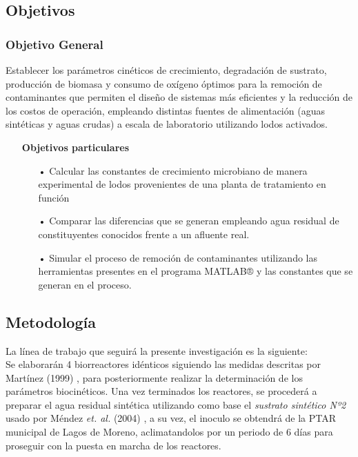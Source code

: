 \subsection*{Objetivos}
\subsubsection*{Objetivo General}
Establecer los parámetros cinéticos de crecimiento, degradación de sustrato, producción de biomasa y consumo de oxígeno óptimos para la remoción de contaminantes que permiten el diseño de sistemas más eficientes y la reducción de los costos de operación, empleando distintas fuentes de alimentación (aguas sintéticas y aguas crudas) a escala de laboratorio utilizando lodos activados.
	\begin{itemize}
		\item[] \textbf{Objetivos particulares}
			\begin{itemize}
				\item[•] Calcular las constantes de crecimiento microbiano de manera experimental de lodos provenientes de una planta de tratamiento en función
				\item[•] Comparar las diferencias que se generan empleando agua residual de constituyentes conocidos frente a un afluente real.
				\item[•]	Simular el proceso de remoción de contaminantes utilizando las herramientas presentes en el programa MATLAB® y las constantes que se generan en el proceso.
			\end{itemize}
	\end{itemize}
\subsection*{Metodología}
La línea de trabajo que seguirá la presente investigación es la siguiente:\\
Se elaborarán 4 biorreactores idénticos siguiendo las medidas descritas por Martínez (1999) \emph{\citep{delgadillo}}, para posteriormente realizar la determinación de los parámetros biocinéticos.
Una vez terminados los reactores, se procederá a preparar el agua residual sintética utilizando como base el \emph{sustrato sintético Nº2} usado por Méndez \textit{et. al.} (2004) \emph{\citep{mendez2004}}, a su vez, el inoculo se obtendrá de la PTAR municipal de Lagos de Moreno, aclimatandolos por un periodo de 6 días para proseguir con la puesta en marcha de los reactores.

